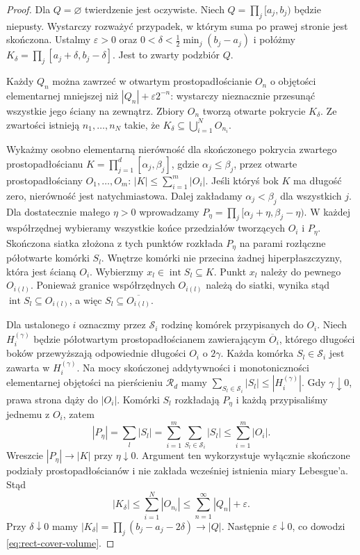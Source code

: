 \begin{proof}
Dla $Q=\varnothing$ twierdzenie jest oczywiste.
Niech $Q=\prod_j[a_j,b_j)$ będzie niepusty.
Wystarczy rozważyć przypadek, w którym suma po prawej
stronie jest skończona. Ustalmy $\varepsilon>0$ oraz
$0<\delta<\frac12\min_j(b_j-a_j)$ i połóżmy
$K_\delta=\prod_j[a_j+\delta,b_j-\delta]$.
Jest to zwarty podzbiór $Q$.

Każdy $Q_n$ można zawrzeć w otwartym prostopadłościanie
$O_n$ o objętości elementarnej mniejszej niż
$|Q_n|+\varepsilon2^{-n}$: wystarczy nieznacznie
przesunąć wszystkie jego ściany na zewnątrz.
Zbiory $O_n$ tworzą otwarte pokrycie $K_\delta$.
Ze zwartości istnieją $n_1,\ldots,n_N$ takie, że
$K_\delta\subseteq\bigcup_{i=1}^N O_{n_i}$.

Wykażmy osobno elementarną nierówność dla skończonego
pokrycia zwartego prostopadłościanu
$K=\prod_{j=1}^d[\alpha_j,\beta_j]$, gdzie
$\alpha_j\le\beta_j$, przez otwarte prostopadłościany
$O_1,\ldots,O_m$:
$|K|\le\sum_{i=1}^m|O_i|$.
Jeśli któryś bok $K$ ma długość zero, nierówność jest
natychmiastowa. Dalej zakładamy $\alpha_j<\beta_j$
dla wszystkich $j$. Dla dostatecznie małego $\eta>0$ wprowadzamy
$P_\eta=\prod_j[\alpha_j+\eta,\beta_j-\eta)$.
W każdej współrzędnej wybieramy wszystkie końce
przedziałów tworzących $O_i$ i $P_\eta$.
Skończona siatka złożona z tych punktów rozkłada
$P_\eta$ na parami rozłączne półotwarte komórki $S_l$.
Wnętrze komórki nie przecina żadnej hiperpłaszczyzny,
która jest ścianą $O_i$. Wybierzmy
$x_l\in\operatorname{int}S_l\subseteq K$.
Punkt $x_l$ należy do pewnego $O_{i(l)}$.
Ponieważ granice współrzędnych $O_{i(l)}$ należą do
siatki, wynika stąd
$\operatorname{int}S_l\subseteq O_{i(l)}$, a więc
$S_l\subseteq\overline{O_{i(l)}}$.

Dla ustalonego $i$ oznaczmy przez $\mathcal S_i$ rodzinę
komórek przypisanych do $O_i$. Niech $H_i^{(\gamma)}$
będzie półotwartym prostopadłościanem zawierającym
$\overline O_i$, którego długości boków przewyższają
odpowiednie długości $O_i$ o $2\gamma$.
Każda komórka $S_l\in\mathcal S_i$ jest zawarta w
$H_i^{(\gamma)}$. Na mocy skończonej addytywności
i monotoniczności elementarnej objętości na pierścieniu
$\mathcal R_d$ mamy
$\sum_{S_l\in\mathcal S_i}|S_l|
\le |H_i^{(\gamma)}|$.
Gdy $\gamma\downarrow0$, prawa strona dąży do $|O_i|$.
Komórki $S_l$ rozkładają $P_\eta$ i każdą przypisaliśmy
jednemu z $O_i$, zatem
\[
 |P_\eta|=\sum_l|S_l|
 =\sum_{i=1}^m\sum_{S_l\in\mathcal S_i}|S_l|
 \le\sum_{i=1}^m|O_i|.
\]
Wreszcie $|P_\eta|\to|K|$ przy $\eta\downarrow0$.
Argument ten wykorzystuje wyłącznie skończone podziały
prostopadłościanów i nie zakłada wcześniej istnienia miary
Lebesgue'a.
Stąd
\[
|K_\delta|\le\sum_{i=1}^N|O_{n_i}|
\le\sum_{n=1}^\infty|Q_n|+\varepsilon.
\]
Przy $\delta\downarrow0$ mamy
$|K_\delta|=\prod_j(b_j-a_j-2\delta)\to|Q|$.
Następnie $\varepsilon\downarrow0$, co dowodzi
\eqref{eq:rect-cover-volume}.
\end{proof}

